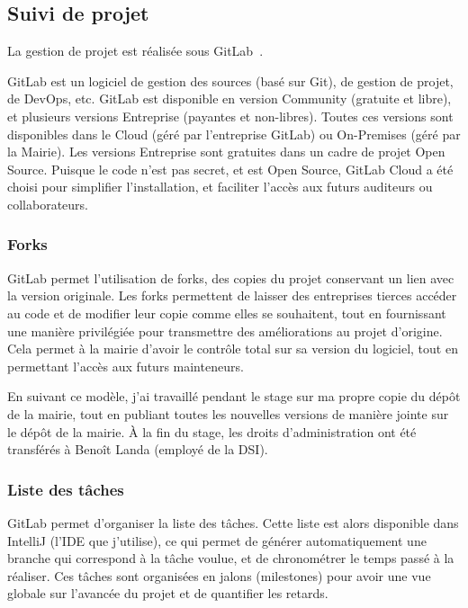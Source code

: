 \documentclass[11pt,french]{memoir}
\begin{document}
	\subsection{Suivi de projet}\label{subsec:suivi-de-projet}

	La gestion de projet est réalisée sous GitLab~\cite{gitlab}.

	GitLab est un logiciel de gestion des sources (basé sur Git), de gestion de projet, de DevOps, etc.
	GitLab est disponible en version Community (gratuite et libre), et plusieurs versions Entreprise (payantes et non-libres).
	Toutes ces versions sont disponibles dans le Cloud (géré par l'entreprise GitLab) ou On-Premises (géré par la Mairie).
	Les versions Entreprise sont gratuites dans un cadre de projet Open Source.
	Puisque le code n'est pas secret, et est Open Source, GitLab Cloud a été choisi pour simplifier l'installation, et faciliter l'accès aux futurs auditeurs ou collaborateurs.

	\subsubsection{Forks}

	GitLab permet l'utilisation de forks, des copies du projet conservant un lien avec la version originale.
	Les forks permettent de laisser des entreprises tierces accéder au code et de modifier leur copie comme elles se souhaitent, tout en fournissant une manière privilégiée pour transmettre des améliorations au projet d'origine.
	Cela permet à la mairie d'avoir le contrôle total sur sa version du logiciel, tout en permettant l'accès aux futurs mainteneurs.

	En suivant ce modèle, j'ai travaillé pendant le stage sur ma propre copie du dépôt de la mairie, tout en publiant toutes les nouvelles versions de manière jointe sur le dépôt de la mairie.
	À la fin du stage, les droits d'administration ont été transférés à Benoît Landa (employé de la DSI).

	\subsubsection{Liste des tâches}

	GitLab permet d'organiser la liste des tâches.
	Cette liste est alors disponible dans IntelliJ (l'IDE que j'utilise), ce qui permet de générer automatiquement une branche qui correspond à la tâche voulue, et de chronométrer le temps passé à la réaliser.
	Ces tâches sont organisées en jalons (milestones) pour avoir une vue globale sur l'avancée du projet et de quantifier les retards.
\end{document}
